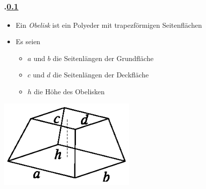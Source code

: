 \subsection{\stitle}\label{S:Beispiel Obelisk}
\begin{frame}[t]%
    \frametitle{\kap.\ref{S:Beispiel Obelisk} \stitle}%
\medskip

\begin{itemize}
 \item Ein \emph{Obelisk} ist ein Polyeder mit trapezf\"ormigen Seitenfl\"achen
 \item Es seien
 \begin{itemize}
  \item $a$ und $b$ die Seitenl\"angen der Grundfl\"ache
  \item $c$ und $d$ die Seitenl\"angen der Deckfl\"ache
  \item $h$ die H\"ohe des Obelisken
 \end{itemize}
\end{itemize}

\begin{center}
\includegraphics[width=0.5\textwidth]{guterStartInsPraktikum/bilder/obelisk}
\end{center}

%
\end{frame}

